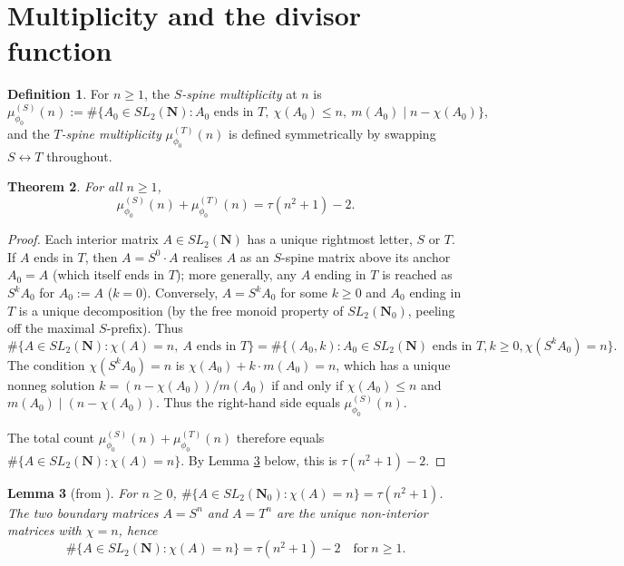 \documentclass[11pt]{article}
\newtheorem{theorem}{Theorem}[section]
\newtheorem{lemma}[theorem]{Lemma}
\theoremstyle{definition}
\newtheorem{definition}[theorem]{Definition}
\newcommand{\N}{\mathbf{N}}
\newcommand{\Nz}{\mathbf{N}_0}
\newcommand{\SLNz}{SL_2(\Nz)}
\newcommand{\SLN}{SL_2(\N)}
\begin{document}
\section{Multiplicity and the divisor function}\label{sec:multiplicity}

\begin{definition}\label{def:mult}
For $n \ge 1$, the \emph{$S$-spine multiplicity} at $n$ is
\[
\mu^{(S)}_{\phi_0}(n) := \#\{ A_0 \in \SLN : A_0 \text{ ends in } T,\ \chi(A_0) \le n,\ m(A_0) \mid n - \chi(A_0)\},
\]
and the \emph{$T$-spine multiplicity} $\mu^{(T)}_{\phi_0}(n)$ is defined symmetrically by swapping $S \leftrightarrow T$ throughout.
\end{definition}

\begin{theorem}\label{thm:multiplicity}
For all $n \ge 1$,
\[
\mu^{(S)}_{\phi_0}(n) + \mu^{(T)}_{\phi_0}(n) = \tau(n^2+1) - 2.
\]
\end{theorem}

\begin{proof}
Each interior matrix $A \in \SLN$ has a unique rightmost letter, $S$ or $T$. If $A$ ends in $T$, then $A = S^0 \cdot A$ realises $A$ as an $S$-spine matrix above its anchor $A_0 = A$ (which itself ends in $T$); more generally, any $A$ ending in $T$ is reached as $S^k A_0$ for $A_0 := A$ ($k = 0$). Conversely, $A = S^k A_0$ for some $k \ge 0$ and $A_0$ ending in $T$ is a unique decomposition (by the free monoid property of $\SLNz$, peeling off the maximal $S$-prefix). Thus
\[
\#\{A \in \SLN : \chi(A) = n,\ A \text{ ends in } T\} = \#\{(A_0, k) : A_0 \in \SLN \text{ ends in } T, k \ge 0, \chi(S^k A_0) = n\}.
\]
The condition $\chi(S^k A_0) = n$ is $\chi(A_0) + k \cdot m(A_0) = n$, which has a unique nonneg solution $k = (n - \chi(A_0))/m(A_0)$ if and only if $\chi(A_0) \le n$ and $m(A_0) \mid (n - \chi(A_0))$. Thus the right-hand side equals $\mu^{(S)}_{\phi_0}(n)$.

The total count $\mu^{(S)}_{\phi_0}(n) + \mu^{(T)}_{\phi_0}(n)$ therefore equals $\#\{A \in \SLN : \chi(A) = n\}$. By Lemma \ref{lem:tau-count} below, this is $\tau(n^2+1) - 2$.
\end{proof}

\begin{lemma}[from \cite{shakov}]\label{lem:tau-count}
For $n \ge 0$, $\#\{A \in \SLNz : \chi(A) = n\} = \tau(n^2+1)$. The two boundary matrices $A = S^n$ and $A = T^n$ are the unique non-interior matrices with $\chi = n$, hence
\[
\#\{A \in \SLN : \chi(A) = n\} = \tau(n^2+1) - 2 \quad \text{for}\ n \ge 1.
\]
\end{lemma}
\end{document}
